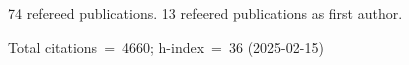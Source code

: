 74 refereed publications. 13 refeered publications as first author.

Total citations~=~4660; h-index~=~36 (2025-02-15)